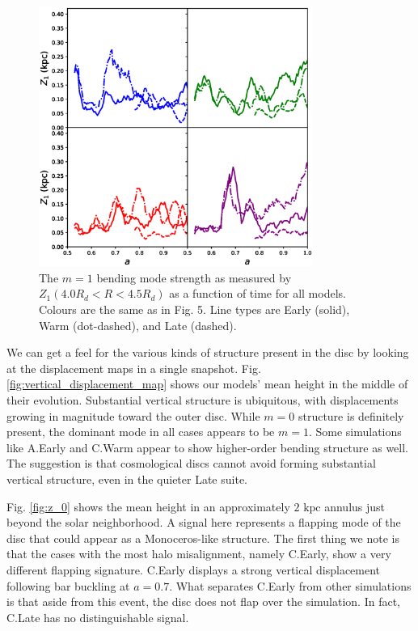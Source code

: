 \begin{figure}
	\centering
	\includegraphics[width=0.8\textwidth]{../figures/z_1_all_models_four_panel.eps}
	\caption{The $m=1$ bending mode strength as measured by $Z_1(4.0 R_d < R < 4.5 R_d)$ as a function of time for all models. Colours are the same as in Fig. 5. Line types are Early (solid), Warm (dot-dashed), and Late (dashed).} \label{fig:z_1}
\end{figure}


We can get a feel for the various kinds of structure present in the disc by looking at the displacement maps in a single snapshot. Fig. \ref{fig:vertical_displacement_map} shows our models' mean height in the middle of their evolution. Substantial vertical structure is ubiquitous, with displacements growing in magnitude toward the outer disc. While $m=0$ structure is definitely present, the dominant mode in all cases appears to be $m=1$. Some simulations like A.Early and C.Warm appear to show higher-order bending structure as well. The suggestion is that cosmological discs cannot avoid forming substantial vertical structure, even in the quieter Late suite.

Fig. \ref{fig:z_0} shows the mean height in an approximately $2 \text{ kpc}$ annulus just beyond the solar neighborhood. A signal here represents a flapping mode of the disc that could appear as a Monoceros-like structure. The first thing we note is that the cases with the most halo misalignment, namely C.Early, show a very different flapping signature. C.Early displays a strong vertical displacement following bar buckling at $a=0.7$.  What separates C.Early from other simulations is that aside from this event, the disc does not flap over the simulation. In fact, C.Late has no distinguishable signal.

